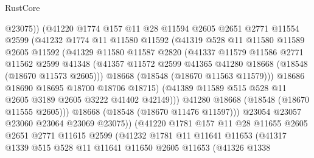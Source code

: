 \begin{lexlean}{RustCore}
\begin{coremodule}
                      @23075))
                  (@41220
                    @1774
                    @157
                    @11
                    @28
                    @11594
                    @2605
                    @2651
                    @2771
                    @11554
                    @2599
                    (@41232
                      @1774
                      @11
                      @11580
                      @11592
                      (@41319
                        @528
                        @11
                        @11580
                        @11589
                        @2605
                        @11592
                        (@41329
                          @11580
                          @11587
                          @2820
                          (@41337
                            @11579
                            @11586
                            @2771
                            @11562
                            @2599
                            @41348
                            (@41357
                              @11572
                              @2599
                              @41365
                              @41280
                              @18668
                              (@18548 (@18670 @11573 @2605)))
                            @18668
                            (@18548 (@18670 @11563 @11579)))
                          @18686
                          @18690
                          @18695
                          @18700
                          @18706
                          @18715)
                        (@41389 @11589 @515 @528 @11 @2605 @3189 @2605 @3222 @41402 @42149)))
                    @41280
                    @18668
                    (@18548 (@18670 @11555 @2605)))
                  @18668
                  (@18548 (@18670 @11476 @11597)))
                @23054
                @23057
                @23060
                @23064
                @23069
                @23075))
            (@41220
              @1781
              @157
              @11
              @28
              @11655
              @2605
              @2651
              @2771
              @11615
              @2599
              (@41232
                @1781
                @11
                @11641
                @11653
                (@41317
                  @1339
                  @515
                  @528
                  @11
                  @11641
                  @11650
                  @2605
                  @11653
                  (@41326
                    @1338

\end{coremodule}
\end{lexlean}
